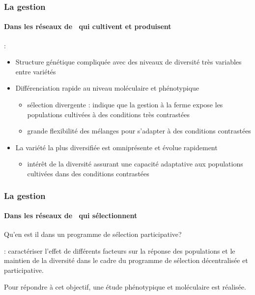 \begin{frame}
\frametitle{La gestion \insitu}
\framesubtitle{Dans les réseaux de \MSPs~qui cultivent et produisent}

:

\begin{itemize}
\item Structure génétique compliquée avec des niveaux de diversité très variables entre variétés

\item Différenciation rapide au niveau moléculaire et phénotypique
\begin{itemize}
\item sélection divergente : indique que la gestion à la ferme expose les populations cultivées à des conditions très contrastées
\item grande flexibilité des mélanges pour s’adapter à des conditions contrastées
\end{itemize}

\item La variété la plus diversifiée est omniprésente et évolue rapidement
\begin{itemize}
\item intérêt de la diversité assurant une capacité adaptative aux populations cultivées dans des conditions contrastées
\end{itemize}

\end{itemize}

\end{frame}



\begin{frame}
\frametitle{La gestion \insitu}
\framesubtitle{Dans les réseaux de \MSPs~qui sélectionnent}

Qu'en est il dans un programme de sélection participative? \\

\vfill


 : caractériser l'effet de différents facteurs sur la réponse des populations et le maintien de la diversité dans le cadre du programme de sélection décentralisée et participative.

\vfill

\begin{block}{}
Pour répondre à cet objectif, une étude phénotypique et moléculaire est réalisée.
\end{block}

\end{frame}


